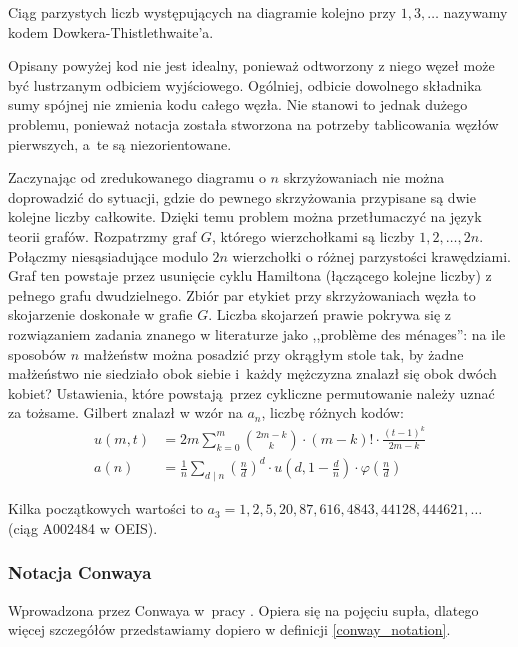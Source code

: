 \begin{definition}
    Ciąg parzystych liczb występujących na diagramie kolejno przy $1, 3, \ldots$ nazywamy kodem Dowkera-Thistlethwaite'a.
\end{definition}

Opisany powyżej kod nie jest idealny, ponieważ odtworzony z niego węzeł może być lustrzanym odbiciem wyjściowego.
Ogólniej, odbicie dowolnego składnika sumy spójnej nie zmienia kodu całego węzła.
Nie stanowi to jednak dużego problemu, ponieważ notacja została stworzona na potrzeby tablicowania węzłów pierwszych, a~te są niezorientowane.

Zaczynając od zredukowanego diagramu o $n$ skrzyżowaniach nie można doprowadzić do sytuacji, gdzie do pewnego skrzyżowania przypisane są dwie kolejne liczby całkowite.
Dzięki temu problem można przetłumaczyć na język teorii grafów.
Rozpatrzmy graf $G$, którego wierzchołkami są liczby $1, 2, \ldots, 2n$.
Połączmy niesąsiadujące modulo $2n$ wierzchołki o różnej parzystości krawędziami.
Graf ten powstaje przez usunięcie cyklu Hamiltona (łączącego kolejne liczby) z pełnego grafu dwudzielnego.
Zbiór par etykiet przy skrzyżowaniach węzła to skojarzenie doskonałe w grafie $G$.
Liczba skojarzeń prawie pokrywa się z rozwiązaniem zadania znanego w literaturze jako ,,problème des ménages'': na ile sposobów $n$ małżeństw można posadzić przy okrągłym stole tak, by żadne małżeństwo nie siedziało obok siebie i~każdy mężczyzna znalazł się obok dwóch kobiet?
Ustawienia, które powstają przez cykliczne permutowanie należy uznać za tożsame.
Gilbert znalazł w \cite{gilbert56} wzór na $a_n$, liczbę różnych kodów:
\begin{align}
u(m, t) & = 2m \sum_{k=0}^m {2m-k \choose k} \cdot (m-k)! \cdot \frac{(t-1)^k}{2m - k}  \\
a(n) & = \frac{1}{n} \sum_{d\mid n} \left(\frac{n}{d}\right)^d \cdot u \left(d, 1 - \frac{d}{n}\right) \cdot \varphi \left(\frac{n}{d}\right)
\end{align}

Kilka początkowych wartości to $a_3 = 1, 2, 5, 20, 87, 616, 4843, 44128, 444621, \ldots$ (ciąg A002484 w OEIS).

\subsubsection{Notacja Conwaya}
Wprowadzona przez Conwaya w~pracy \cite{conway70}.
Opiera się na pojęciu supła, dlatego więcej szczegółów przedstawiamy dopiero w definicji \ref{conway_notation}.
